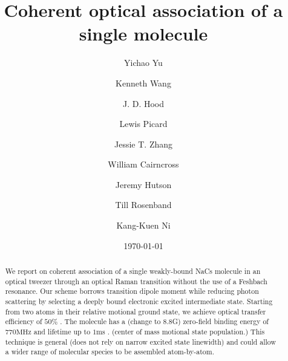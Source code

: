 \documentclass[aps,prl,twocolumn,groupedaddress]{revtex4-1}
\newcommand{\todo}[1]{}
\begin{document}
\title{Coherent optical association of a single molecule}
\author{Yichao Yu}
\author{Kenneth Wang}
\author{J. D. Hood}
\author{Lewis Picard}
\author{Jessie T. Zhang}
\author{William Cairncross}
\author{Jeremy Hutson}
\author{Till Rosenband}
\author{Kang-Kuen Ni}

\date{\today}

\begin{abstract}
  We report on coherent association of a single weakly-bound NaCs molecule in an optical tweezer
  through an optical Raman transition without the use of a Feshbach resonance. Our scheme borrows transition dipole moment while reducing photon scattering by selecting a deeply bound electronic excited intermediate state.
  Starting from two atoms in their relative motional ground state,
  we achieve optical transfer efficiency of $50 \%$ \todo{number}.
  The molecule has a (change to 8.8G) zero-field binding energy of $770 \mathrm{MHz}$ \todo{number}
  and lifetime up to $1 \mathrm{ms}$ \todo{number}. (center of mass motional state population.)
  This technique is general (does not rely on narrow excited state linewidth) and could allow a wider range of molecular species to be assembled atom-by-atom.
\end{abstract}


\maketitle



\end{document}
